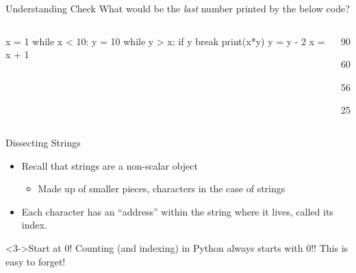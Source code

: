 \documentclass[pdf, aspectratio=169, 12pt]{beamer}
\begin{document}
\begin{frame}[fragile]{Understanding Check}
	What would be the \emph{last} number printed by the below code?
	\begin{columns}
		\begin{pythoncode}
			x = 1
			while x < 10:
				y = 10
				while y > x:
					if y %
						break
					print(x*y)
					y = y - 2
				x = x + 1
		\end{pythoncode}
		
		\begin{poll}
		\item 90
		\item 60
		\item 56
		\item 25
		\end{poll}
	\end{columns}
\end{frame}

\begin{frame}{Dissecting Strings}
	\vspace{5mm}
	\begin{itemize}
		\item Recall that strings are a non-scalar object
			\begin{itemize}
				\item Made up of smaller pieces, \alert{characters} in the case of strings
			\end{itemize}
		\item Each character has an ``address'' within the string where it lives, called its \alert{index}.
	\end{itemize}
	\begin{center}
	\end{center}
			\begin{alertblock}<3->{Start at 0!}
				Counting (and indexing) in Python always starts with 0!! This is easy to forget!
			\end{alertblock}
\end{frame}
\end{document}

